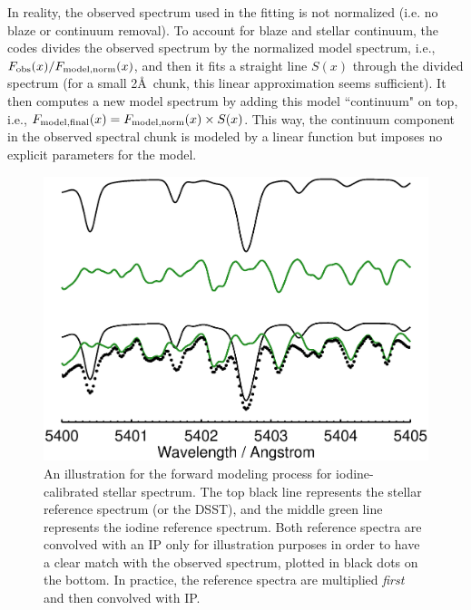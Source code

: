In reality, the observed spectrum used in the fitting is not
normalized (i.e. no blaze or continuum removal). To account for blaze
and stellar continuum, the codes divides the observed spectrum by the
normalized model spectrum, i.e., $F_{\rm obs}(x)/F_{\rm model,
  norm}(x)$, and then it fits a straight line $S(x)$ through the
divided spectrum (for a small 2\AA\ chunk, this linear approximation
seems sufficient). It then computes a new model spectrum by adding
this model ``continuum" on top, i.e., $F_{\rm model, final}(x) =
F_{\rm model, norm}(x) \times S(x)$. This way, the continuum component
in the observed spectral chunk is modeled by a linear function but
imposes no explicit parameters for the model.



\begin{figure}
\includegraphics[scale=0.6]{doppler/forward_modeling.eps}
\caption{An illustration for the forward modeling process for
  iodine-calibrated stellar spectrum. The top black line represents
  the stellar reference spectrum (or the DSST), and the middle green line
  represents the iodine reference spectrum. Both reference spectra are
  convolved with an IP only for illustration purposes in order to have
  a clear match with the observed spectrum, plotted in black dots on
  the bottom. In practice, the reference spectra are multiplied {\it
    first} and then convolved with IP. \label{doppler:fig:modeling}}
\end{figure}



